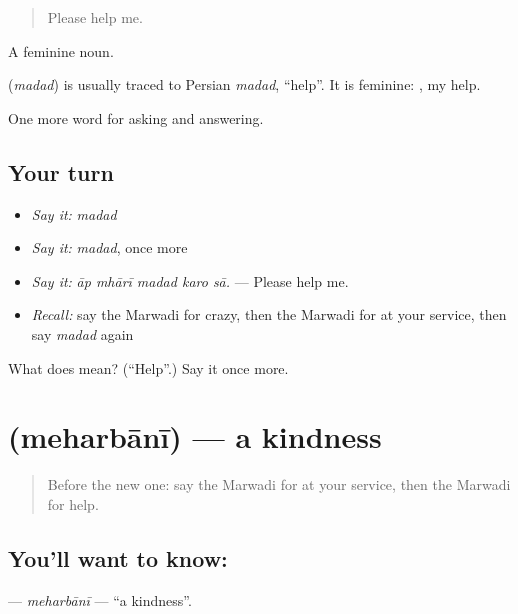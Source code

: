 \begin{quote}
Please help me.
\end{quote}

A feminine noun.

\begin{cousinweb}
\textbf{} (\emph{madad}) is usually traced to Persian \emph{madad}, \textquotedblleft{}help\textquotedblright{}. It is feminine: \textbf{ }, my help.
\end{cousinweb}

\begin{grammarlens}[title={What you've built}]
One more word for asking and answering.
\end{grammarlens}

\subsection*{Your turn}
\begin{itemize}
\raggedright
  \item \emph{Say it:} \emph{madad}
  \item \emph{Say it:} \emph{madad}, once more
  \item \emph{Say it:} \emph{āp mhārī madad karo sā.} — Please help me.
  \item \emph{Recall:} say the Marwadi for crazy, then the Marwadi for at your service, then say \emph{madad} again
\end{itemize}

\begin{tcolorbox}[breakable,colback=teal!4,colframe=teal!35!black,title={Before you move on}]
What does  mean? (\textquotedblleft{}Help\textquotedblright{}.) Say it once more.
\end{tcolorbox}
\section[\texorpdfstring{\mw{मेहरबानी} (meharbānī)}{मेहरबानी (meharbānī)}]{ (meharbānī) — a kindness}

\label{lesson:MW-C266-meharbani}



\begin{quote}
Before the new one: say the Marwadi for at your service, then the Marwadi for help.
\end{quote}

\subsection*{You'll want to know: }
\textbf{} — \emph{meharbānī} — \textquotedblleft{}a kindness\textquotedblright{}.

